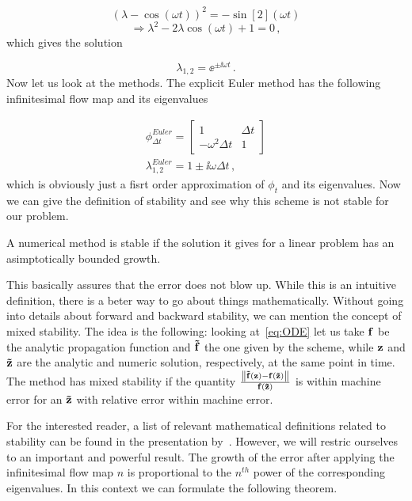 \documentclass[12pt, class=report, crop=false]{standalone}
\begin{document}
\begin{equation*}
  (\lambda - \cos(\omega t))^2 = - \sin[2](\omega t)
\end{equation*}
\begin{equation*}
  \Rightarrow \lambda^2 - 2\lambda \cos(\omega t) +1 = 0\,,
\end{equation*}
which gives the solution

\begin{equation}
  \lambda_{1,2} = \ee^{\pm \ii \omega t}\,.
\end{equation}
Now let us look at the methods. The explicit Euler method has the following infinitesimal flow map and its eigenvalues

\begin{subequations}
  \begin{align}
  \phi_{\Delta t}^{Euler} =
  \begin{bmatrix}
    1 & \Delta t \\
    -\omega^2 \Delta t & 1
  \end{bmatrix}\\
  \lambda_{1,2}^{Euler} = 1 \pm \ii \omega \Delta t\,,
  \end{align}
\end{subequations}
which is obviously just a fisrt order approximation of \(\phi_t\) and its eigenvalues. Now we can give the definition of stability and see why this scheme is not stable for our problem.

\begin{definition}
  A numerical method is stable if the solution it gives for a linear problem has an asimptotically bounded growth.
\end{definition}

This basically assures that the error does not blow up. While this is an intuitive definition, there is a beter way to go about things mathematically. Without going into details about forward and backward stability, we can mention the concept of mixed stability. The idea is the following: looking at~\cref{eq:ODE} let us take \(\vb{f}\) be the analytic propagation function and \(\vb{\tilde{f}}\) the one given by the scheme, while \(\vb{z}\) and \(\vb{\tilde{z}}\) are the analytic and numeric solution, respectively, at the same point in time. The method has mixed stability if the quantity \(\frac{\norm{\vb{\tilde{f}}(\vb{z}) - \vb{f}(\vb{\tilde{z}})}}{\vb{f}(\vb{\tilde{z}})}\) is within machine error for an \(\vb{\tilde{z}}\) with relative error within machine error.

For the interested reader, a list of relevant mathematical definitions related to stability can be found in the presentation by~\cite{liuConditioningNumericalStability}. However, we will restric ourselves to an important and powerful result. The growth of the error after applying the infinitesimal flow map \(n\) is proportional to the \(n^{th}\) power of the corresponding eigenvalues. In this context we can formulate the following theorem.
\end{document}
